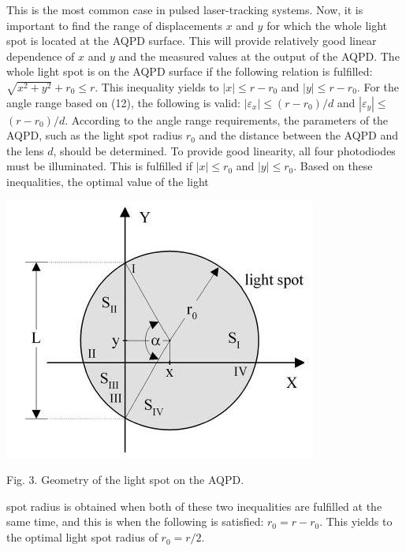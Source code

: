 \documentclass[10pt]{article}
\begin{document}
This is the most common case in pulsed laser-tracking systems. Now, it is important to find the range of displacements \(x\) and \(y\) for which the whole light spot is located at the AQPD surface. This will provide relatively good linear dependence of \(x\) and \(y\) and the measured values at the output of the AQPD. The whole light spot is on the AQPD surface if the following relation is fulfilled: \(\sqrt{x^{2}+y^{2}}+r_{0} \leq r\). This inequality yields to \(|x| \leq r-r_{0}\) and \(|y| \leq r-r_{0} .\) For the angle range based on (12), the following is valid: \(\left|\varepsilon_{x}\right| \leq\left(r-r_{0}\right) / d\) and \(\left|\varepsilon_{y}\right| \leq\) \(\left(r-r_{0}\right) / d\). According to the angle range requirements, the parameters of the AQPD, such as the light spot radius \(r_{0}\) and the distance between the AQPD and the lens \(d\), should be determined. To provide good linearity, all four photodiodes must be illuminated. This is fulfilled if \(|x| \leq r_{0}\) and \(|y| \leq r_{0}\). Based on these inequalities, the optimal value of the light

\includegraphics[max width=\textwidth]{5ecfdecb1168916efbeaf9054b715324-04}

Fig. 3. Geometry of the light spot on the AQPD.

spot radius is obtained when both of these two inequalities are fulfilled at the same time, and this is when the following is satisfied: \(r_{0}=r-r_{0}\). This yields to the optimal light spot radius of \(r_{0}=r / 2\).
\end{document}
